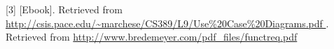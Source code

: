 \documentclass[12pt,a4paper]{article}
\begin{document}
\begin{comment}
\hline
\multirow{3}{1.9em}{FR11} & \makecell{Search} & \makecell{
Find \\a user}  & \makecell{Select \\“search” in\\ Home page} & \makecell{Retrieve \\information\\ from \\database} & \makecell {Display\\ search \\results} \\
\hline
\end{longtable}
\end{center}
\newpage

\end{comment}






[3] [Ebook]. Retrieved from \hspace{0.1cm} \url{http://csis.pace.edu/~marchese/CS389/L9/Use%20Case%20Diagrams.pdf }
\vspace{0.5cm}\newline
[4] [Ebook]. Retrieved from \hspace{0.1cm}\url{http://www.bredemeyer.com/pdf_files/functreq.pdf}
\end{document}
